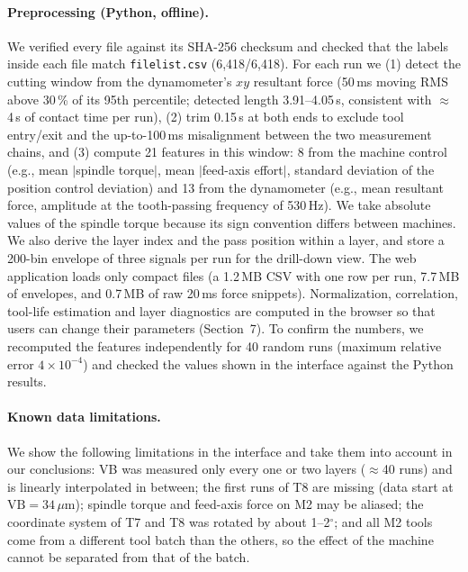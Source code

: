 \paragraph{Preprocessing (Python, offline).}
We verified every file against its SHA-256 checksum and checked that the labels inside each file
match \texttt{filelist.csv} (6,418/6,418).
For each run we
(1) detect the cutting window from the dynamometer's $xy$ resultant force
(50\,ms moving RMS above 30\,\% of its 95th percentile; detected length 3.91--4.05\,s, consistent with
$\approx$4\,s of contact time per run),
(2) trim 0.15\,s at both ends to exclude tool entry/exit and the up-to-100\,ms misalignment between the two
measurement chains, and
(3) compute 21 features in this window: 8 from the machine control
(e.g., mean $|$spindle torque$|$, mean $|$feed-axis effort$|$, standard deviation of the position control
deviation) and 13 from the dynamometer (e.g., mean resultant force, amplitude at the tooth-passing
frequency of 530\,Hz).
We take absolute values of the spindle torque because its sign convention differs between machines.
We also derive the layer index and the pass position within a layer, and store a 200-bin envelope of three
signals per run for the drill-down view.
The web application loads only compact files (a 1.2\,MB CSV with one row per run, 7.7\,MB of envelopes, and
0.7\,MB of raw 20\,ms force snippets). Normalization, correlation, tool-life estimation and layer
diagnostics are computed in the browser so that users can change their parameters
(Section~7). %
To confirm the numbers, we recomputed the features independently for 40 random runs (maximum relative error
$4\times10^{-4}$) and checked the values shown in the interface against the Python results.

\paragraph{Known data limitations.}
We show the following limitations in the interface and take them into account in our conclusions:
VB was measured only every one or two layers ($\approx$40 runs) and is linearly interpolated in between;
the first runs of T8 are missing (data start at $\mathrm{VB}=34\,\mu$m);
spindle torque and feed-axis force on M2 may be aliased;
the coordinate system of T7 and T8 was rotated by about 1--2$^\circ$;
and all M2 tools come from a different tool batch than the others, so the effect of the machine cannot be
separated from that of the batch.

